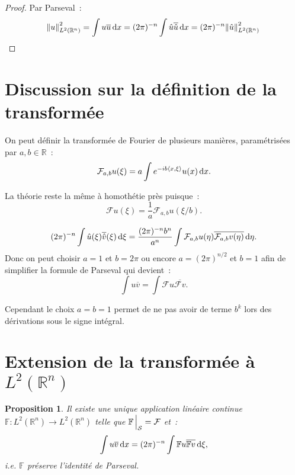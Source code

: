 \documentclass{report}
\newcommand{\R}{{\mathbb R}}
\newcommand{\scpr}[2]{\left\langle#1, #2\right\rangle}
\newcommand{\dx}{\dif x}
\newtheorem{prp}[thm]{Proposition}
\theoremstyle{definition}
\theoremstyle{remark}
\begin{document}
\begin{proof} Par Parseval~:
\[\norm u_{L^2(\R^n)}^2 = \int u\overline u\dif x = (2\pi)^{-n}\int \hat u\overline {\hat u}\dif x = (2\pi)^{-n}\norm {\hat u}_{L^2(\R^n)}^2\]
\end{proof}

\section{Discussion sur la définition de la transformée}

On peut définir la transformée de Fourier de plusieurs manières, paramétrisées par $a, b \in \R$~:
\[\mathcal F_{a,b}u(\xi) = a\int e^{-ib\scpr x\xi}u(x)\dx.\]

La théorie reste la même à homothétie près puisque~:
\[\mathcal Fu(\xi) = \frac 1a\mathcal F_{a,b}u(\xi/b).\]

\[(2\pi)^{-n}\int \hat u(\xi)\overline {\hat v}(\xi)\dif\xi = \frac {(2\pi)^{-n}b^n}{a^n}\int\mathcal F_{a,b}u(\eta)\overline {\mathcal F_{a,b}v(\eta)}\dif\eta.\]
Donc on peut choisir $a=1$ et $b=2\pi$ ou encore $a=(2\pi)^{n/2}$ et $b=1$ afin de simplifier la formule de Parseval qui devient~:
\[\int u\overline v = \int \mathcal Fu\overline {\mathcal Fv}.\]

Cependant le choix $a=b=1$ permet de ne pas avoir de terme $b^k$ lors des dérivations sous le signe intégral.

\section{Extension de la transformée à $L^2(\R^n)$}

\begin{prp} Il existe une unique application linéaire continue $\mathbb F : L^2(\R^n) \to L^2(\R^n)$ telle que $\mathbb F\sVert[2]_{\mathcal S} = \mathcal F$ et~:
\[\int u\overline v\dif x = (2\pi)^{-n}\int \mathbb Fu\overline {\mathbb Fv}\dif\xi,\]
i.e. $\mathbb F$ préserve l'identité de Parseval.
\end{prp}
\end{document}
